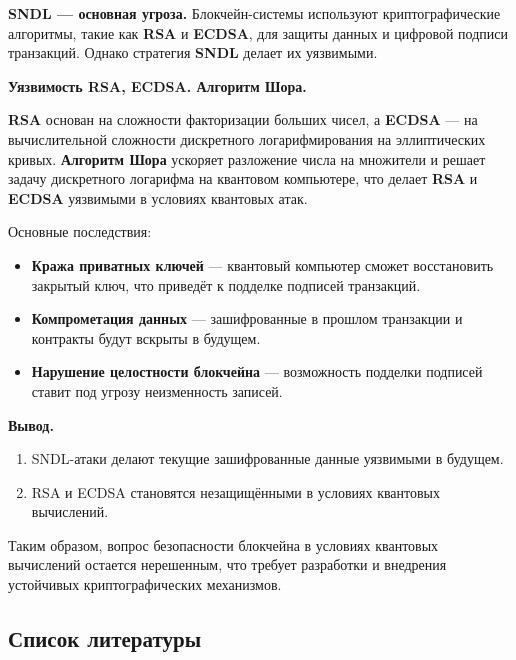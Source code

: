 \documentclass[a4paper]{article}
\begin{document}
\noindent\textbf{SNDL — основная угроза.}  
Блокчейн-системы используют криптографические алгоритмы, такие как \textbf{RSA} и \textbf{ECDSA}, для защиты данных и цифровой подписи транзакций. Однако стратегия \textbf{SNDL} делает их уязвимыми.

\noindent\textbf{Уязвимость RSA, ECDSA. Алгоритм Шора.}  

\textbf{RSA} основан на сложности факторизации больших чисел, а \textbf{ECDSA} — на вычислительной сложности дискретного логарифмирования на эллиптических кривых. 
\textbf{Алгоритм Шора} ускоряет разложение числа на множители и решает задачу дискретного логарифма на квантовом компьютере, что делает \textbf{RSA} и \textbf{ECDSA} уязвимыми в условиях квантовых атак.

Основные последствия:
\begin{itemize}
    \item \textbf{Кража приватных ключей} — квантовый компьютер сможет восстановить закрытый ключ, что приведёт к подделке подписей транзакций.
    \item \textbf{Компрометация данных} — зашифрованные в прошлом транзакции и контракты будут вскрыты в будущем.
    \item \textbf{Нарушение целостности блокчейна} — возможность подделки подписей ставит под угрозу неизменность записей.
\end{itemize}

\noindent\textbf{Вывод.}  
\begin{enumerate}
    \item SNDL-атаки делают текущие зашифрованные данные уязвимыми в будущем.
    \item RSA и ECDSA становятся незащищёнными в условиях квантовых вычислений.
\end{enumerate}

Таким образом, вопрос безопасности блокчейна в условиях квантовых вычислений остается нерешенным, что требует разработки и внедрения устойчивых криптографических механизмов.
\newpage
\begin{center}
\section*{Список литературы}
\end{center}

\vspace{1em}
\end{document}
